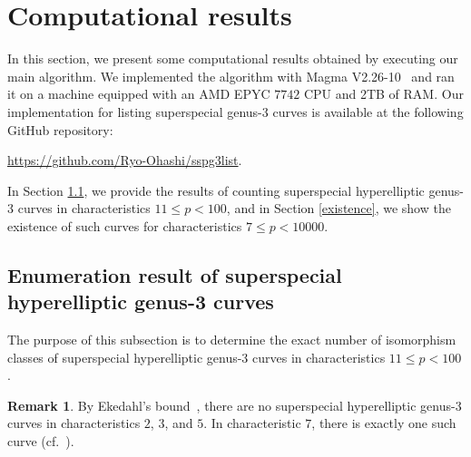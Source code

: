 \documentclass{amsart}
\theoremstyle{definition}
\newtheorem{Rmk}[Def]{Remark}
\theoremstyle{plain}
\begin{document}
\section{Computational results}\label{computation}
In this section, we present some computational results obtained by executing our main algorithm.
We implemented the algorithm with Magma \hspace{-0.5mm}V2.26-10~\cite{MAGMA} and ran it on a machine equipped with an AMD EPYC $7742$ CPU and 2TB of RAM.
Our implementation for listing superspecial genus-3 curves is available at the following GitHub repository:\medskip
\begin{center}
    {\url{https://github.com/Ryo-Ohashi/sspg3list}.}\medskip\vspace{1mm}
\end{center}
In Section \ref{listup}, we provide the results of counting superspecial hyperelliptic genus-3 curves in characteristics $11 \leq p < 100$, and in Section \ref{existence}, we show the existence of such curves for characteristics $7 \leq p < 10000$.

\subsection{Enumeration result of superspecial hyperelliptic genus-3 curves}\label{listup}
The purpose of this subsection is to determine the exact number of isomorphism classes of superspecial hyperelliptic genus-3 curves in characteristics $11 \leq p < 100$.
\begin{Rmk}
By Ekedahl's bound~\cite[Theorem II.1.1]{Ekedahl}, there are no superspecial hyperelliptic genus-3 curves in characteristics $2$, $3$, and $5$.
In characteristic $7$, there is exactly one such curve (cf.\ \cite[Theorem 3.15]{Brock}).
\end{Rmk}
\end{document}
